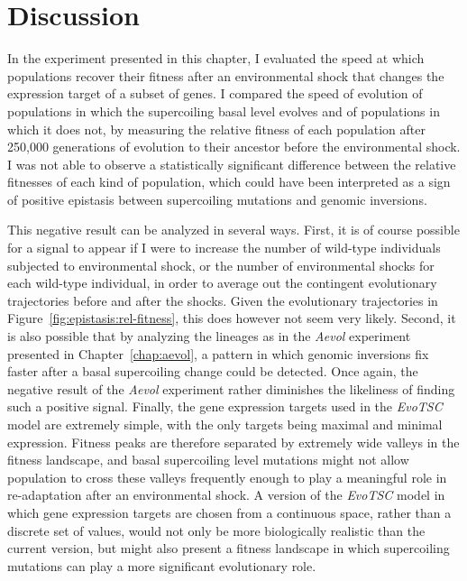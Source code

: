 \section{Discussion}

In the experiment presented in this chapter, I evaluated the speed at which populations recover their fitness after an environmental shock that changes the expression target of a subset of genes.
I compared the speed of evolution of populations in which the supercoiling basal level evolves and of populations in which it does not, by measuring the relative fitness of each population after 250,000 generations of evolution to their ancestor before the environmental shock.
I was not able to observe a statistically significant difference between the relative fitnesses of each kind of population, which could have been interpreted as a sign of positive epistasis between supercoiling mutations and genomic inversions.

This negative result can be analyzed in several ways.
First, it is of course possible for a signal to appear if I were to increase the number of wild-type individuals subjected to environmental shock, or the number of environmental shocks for each wild-type individual, in order to average out the contingent evolutionary trajectories before and after the shocks.
Given the evolutionary trajectories in Figure~\ref{fig:epistasis:rel-fitness}, this does however not seem very likely.
Second, it is also possible that by analyzing the lineages as in the \emph{Aevol} experiment presented in Chapter~\ref{chap:aevol}, a pattern in which genomic inversions fix faster after a basal supercoiling change could be detected.
Once again, the negative result of the \emph{Aevol} experiment rather diminishes the likeliness of finding such a positive signal.
Finally, the gene expression targets used in the \emph{EvoTSC} model are extremely simple, with the only targets being maximal and minimal expression.
Fitness peaks are therefore separated by extremely wide valleys in the fitness landscape, and basal supercoiling level mutations might not allow population to cross these valleys frequently enough to play a meaningful role in re-adaptation after an environmental shock.
A version of the \emph{EvoTSC} model in which gene expression targets are chosen from a continuous space, rather than a discrete set of values, would not only be more biologically realistic than the current version, but might also present a fitness landscape in which supercoiling mutations can play a more significant evolutionary role.